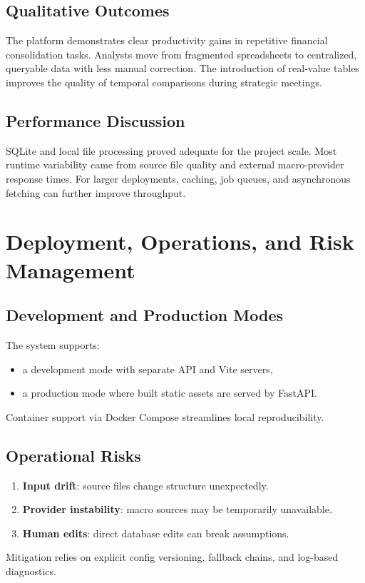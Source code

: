 \documentclass[12pt,a4paper]{report}
\begin{document}
\section{Qualitative Outcomes}
The platform demonstrates clear productivity gains in repetitive financial consolidation tasks. Analysts move from fragmented spreadsheets to centralized, queryable data with less manual correction. The introduction of real-value tables improves the quality of temporal comparisons during strategic meetings.

\section{Performance Discussion}
SQLite and local file processing proved adequate for the project scale. Most runtime variability came from source file quality and external macro-provider response times. For larger deployments, caching, job queues, and asynchronous fetching can further improve throughput.

\chapter{Deployment, Operations, and Risk Management}
\section{Development and Production Modes}
The system supports:
\begin{itemize}[leftmargin=1.5em]
  \item a development mode with separate API and Vite servers,
  \item a production mode where built static assets are served by FastAPI.
\end{itemize}
Container support via Docker Compose streamlines local reproducibility.

\section{Operational Risks}
\begin{enumerate}[leftmargin=1.5em]
  \item \textbf{Input drift}: source files change structure unexpectedly.
  \item \textbf{Provider instability}: macro sources may be temporarily unavailable.
  \item \textbf{Human edits}: direct database edits can break assumptions.
\end{enumerate}
Mitigation relies on explicit config versioning, fallback chains, and log-based diagnostics.
\end{document}
